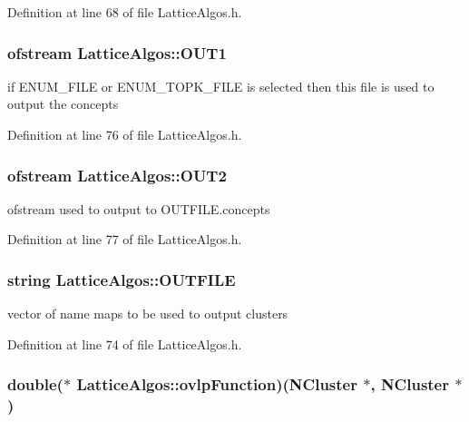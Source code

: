 Definition at line 68 of file LatticeAlgos.h.

\hypertarget{class_lattice_algos_a5e06ea8a8e76d5b6019481e778655a5c}{
\subsubsection[{OUT1}]{\setlength{\rightskip}{0pt plus 5cm}ofstream {\bf LatticeAlgos::OUT1}}}
\label{class_lattice_algos_a5e06ea8a8e76d5b6019481e778655a5c}


if ENUM\_\-FILE or ENUM\_\-TOPK\_\-FILE is selected then this file is used to output the concepts 



Definition at line 76 of file LatticeAlgos.h.

\hypertarget{class_lattice_algos_ad6ee83e69ef859717cbc747edf4fc306}{
\subsubsection[{OUT2}]{\setlength{\rightskip}{0pt plus 5cm}ofstream {\bf LatticeAlgos::OUT2}}}
\label{class_lattice_algos_ad6ee83e69ef859717cbc747edf4fc306}


ofstream used to output to OUTFILE.concepts 



Definition at line 77 of file LatticeAlgos.h.

\hypertarget{class_lattice_algos_aaf79cc2e8513fd28bf1e9329c3e678ab}{
\subsubsection[{OUTFILE}]{\setlength{\rightskip}{0pt plus 5cm}string {\bf LatticeAlgos::OUTFILE}}}
\label{class_lattice_algos_aaf79cc2e8513fd28bf1e9329c3e678ab}


vector of name maps to be used to output clusters 



Definition at line 74 of file LatticeAlgos.h.

\hypertarget{class_lattice_algos_ad2bd9f8cb22cb27dfe527dd2bc38ec2d}{
\subsubsection[{ovlpFunction}]{\setlength{\rightskip}{0pt plus 5cm}double($\ast$ {\bf LatticeAlgos::ovlpFunction})({\bf NCluster} $\ast$, {\bf NCluster} $\ast$)}}
\label{class_lattice_algos_ad2bd9f8cb22cb27dfe527dd2bc38ec2d}


